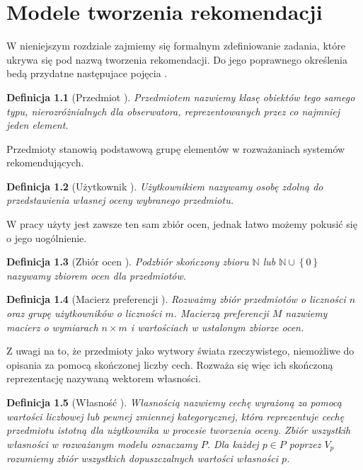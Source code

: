\documentclass[12pt,a4paper]{report}
\newtheorem{df}{Definicja}[chapter]
\newcommand{\set}[1]{\left\lbrace {#1} \right\rbrace}
\newcommand{\setN}{\mathbb{N}}
\begin{document}
\chapter{Modele tworzenia rekomendacji}

W nieniejszym rozdziale zajmiemy się formalnym zdefiniowanie zadania, które ukrywa się pod nazwą tworzenia rekomendacji. Do jego poprawnego określenia bedą przydatne następujace pojęcia .

\begin{df}[Przedmiot {\citep[Sec 1.3]{kidzinski}}]
 Przedmiotem nazwiemy klasę obiektów tego samego typu, nierozróżnialnych dla obserwatora, reprezentowanych przez co najmniej jeden element.
\end{df}

Przedmioty stanowią podstawową grupę elementów w rozważaniach systemów rekomendujących. 

\begin{df}[Użytkownik {\citep[Sec 1.3]{kidzinski}}]
Użytkownikiem nazywamy osobę zdolną do przedstawienia własnej oceny wybranego przedmiotu.
\end{df}

W pracy \citep{kidzinski} użyty jest zawsze ten sam zbiór ocen, jednak łatwo możemy pokusić się o jego uogólnienie.

\begin{df}[Zbiór ocen {\citep[Sec 1.3]{kidzinski}}]
Podzbiór skończony zbioru $\setN$ lub $\setN \cup \set{0}$ nazywamy zbiorem ocen dla przedmiotów. 
\end{df} 

\begin{df}[Macierz preferencji {\citep[Sec 1.3]{kidzinski}}]
Rozważmy zbiór przedmiotów o liczności $n$ oraz grupę użytkowników o liczności $m$. Macierzą preferencji $M$ nazwiemy macierz o wymiarach $n \times m$ i wartościach w ustalonym zbiorze ocen.
\end{df}

Z uwagi na to, że przedmioty jako wytwory świata rzeczywistego, niemożliwe do opisania za pomocą skończonej liczby cech. Rozważa się więc ich skończoną reprezentację nazywaną wektorem własności.

\begin{df}[Własność {\citep[Sec 1.3]{kidzinski}}]
Własnością nazwiemy cechę wyrażoną za pomocą wartości liczbowej lub pewnej zmiennej kategorycznej, która reprezentuje cechę przedmiotu istotną dla użytkownika w procesie tworzenia oceny. Zbiór wszystkih własności w rozważanym modelu oznaczamy $P$. Dla każdej $p \in P$ poprzez $V_p$ rozumiemy zbiór wszystkich dopuszczalnych wartości własności $p$.
\end{df}
\end{document}
